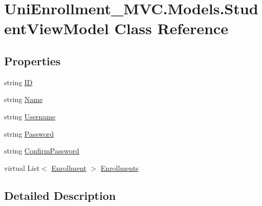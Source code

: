 \hypertarget{class_uni_enrollment___m_v_c_1_1_models_1_1_student_view_model}{}\section{Uni\+Enrollment\+\_\+\+M\+V\+C.\+Models.\+Student\+View\+Model Class Reference}
\label{class_uni_enrollment___m_v_c_1_1_models_1_1_student_view_model}
\subsection*{Properties}
\begin{DoxyCompactItemize}
\item 
string \hyperlink{class_uni_enrollment___m_v_c_1_1_models_1_1_student_view_model_adb736203819c488b94212db3136224f9}{ID}
\item 
string \hyperlink{class_uni_enrollment___m_v_c_1_1_models_1_1_student_view_model_a6374b7a873aa49f3d487d0a098becda0}{Name}
\item 
string \hyperlink{class_uni_enrollment___m_v_c_1_1_models_1_1_student_view_model_a96ba162e18af0894ae751c273c797585}{Username}
\item 
string \hyperlink{class_uni_enrollment___m_v_c_1_1_models_1_1_student_view_model_a3e926b219bc8a9ff6c00d52263b61163}{Password}
\item 
string \hyperlink{class_uni_enrollment___m_v_c_1_1_models_1_1_student_view_model_a26c1bc2dba6280be30f91fc1e04e3c54}{Confirm\+Password}
\item 
virtual List$<$ \hyperlink{class_uni_enrollment___m_v_c_1_1_models_1_1_enrollment}{Enrollment} $>$ \hyperlink{class_uni_enrollment___m_v_c_1_1_models_1_1_student_view_model_a5d41cb2b71a552312bf0fcf7ae8e50ac}{Enrollments}
\end{DoxyCompactItemize}


\subsection{Detailed Description}


